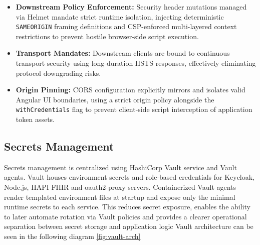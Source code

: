 \begin{itemize}

    \item \textbf{Downstream Policy Enforcement:} Security header mutations managed via Helmet mandate strict runtime isolation, injecting deterministic \texttt{SAMEORIGIN} framing definitions and \ac{CSP}-enforced multi-layered context restrictions to prevent hostile browser-side script execution.
    \item \textbf{Transport Mandates:} Downstream clients are bound to continuous transport security using long-duration \ac{HSTS} responses, effectively eliminating protocol downgrading risks.
    \item \textbf{Origin Pinning:} \ac{CORS} configuration explicitly mirrors and isolates valid Angular UI boundaries, using a strict origin policy alongside the \texttt{withCredentials} flag to prevent client-side script interception of application token assets.
\end{itemize}

\subsection{Secrets Management}
Secrets management is centralized using HashiCorp Vault service and Vault agents. 
Vault houses environment secrets and role-based credentials for Keycloak, Node.js, HAPI FHIR and oauth2-proxy servers. 
Containerized Vault agents render templated environment files at startup and expose only the minimal runtime secrets to each service. 
This reduces secret exposure, enables the ability to later automate rotation via Vault policies 
and provides a clearer operational separation between secret storage and application logic
Vault architecture can be seen in the following diagram \ref{fig:vault-arch}

